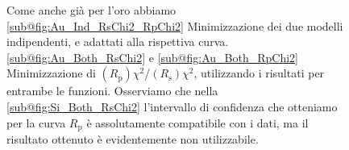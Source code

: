 \documentclass[
    prb,altaffilletter,citeautoscript,
    amsmath,amssymb,
    showpacs,showkeys,floatfix,
    reprint
]{revtex4-1}
\begin{document}
\begin{figure}
    \centering
    
    
    \caption{Come anche già per l'oro abbiamo \ref{sub@fig:Au_Ind_RsChi2_RpChi2} Minimizzazione dei due modelli indipendenti, e adattati alla rispettiva curva. \ref{sub@fig:Au_Both_RsChi2} e \ref{sub@fig:Au_Both_RpChi2} Minimizzazione di $(R_\mathrm{p})\chi^2$/$(R_\mathrm{s})\chi^2$, utilizzando i risultati per entrambe le funzioni. Osserviamo che nella \ref{sub@fig:Si_Both_RsChi2} l'intervallo di confidenza che otteniamo per la curva $R_\mathrm{p}$ è assolutamente compatibile con i dati, ma il risultato ottenuto è evidentemente non utilizzabile.}
\end{figure}
\end{document}
